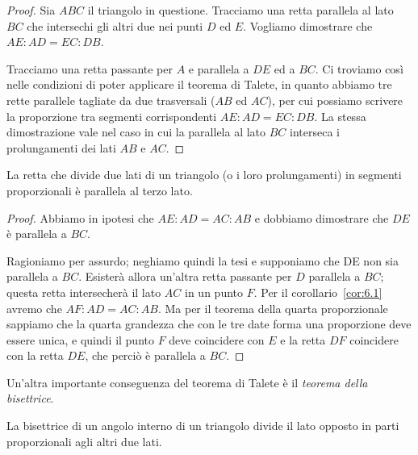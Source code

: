 \begin{figure}[!htb]
	\centering	
\end{figure}

\begin{proof}
Sia $ABC$ il triangolo in questione. Tracciamo una retta parallela al lato $BC$ che intersechi gli altri due nei punti $D$ ed $E$. Vogliamo dimostrare che $AE : AD = EC : DB$.

Tracciamo una retta passante per $A$ e parallela a $DE$ ed a $BC$. Ci troviamo così nelle condizioni di poter applicare il teorema di Talete, in quanto abbiamo tre rette parallele tagliate da due trasversali ($AB$ ed $AC$), per cui possiamo scrivere la proporzione tra segmenti corrispondenti $AE : AD = EC : DB$.
La stessa dimostrazione vale nel caso in cui la parallela al lato $BC$ interseca i prolungamenti dei lati $AB$ e $AC$.
\end{proof}

\begin{corollario}\label{cor:6.2}
La retta che divide due lati di un triangolo (o i loro prolungamenti) in segmenti proporzionali è parallela al terzo lato.
\end{corollario}

\begin{figure}[!htb]
	\centering	
\end{figure}

\begin{proof}
Abbiamo in ipotesi che $AE : AD = AC : AB$ e dobbiamo dimostrare che $DE$ è parallela a $BC$.

Ragioniamo per assurdo; neghiamo quindi la tesi e supponiamo che DE non sia parallela a $BC$. Esisterà allora un'altra retta passante per $D$ parallela a $BC$; questa retta intersecherà il lato $AC$ in un punto $F$. Per il corollario~\ref{cor:6.1} avremo che $AF : AD = AC : AB$.
Ma per il teorema della quarta proporzionale sappiamo che la quarta grandezza che con le tre date forma una proporzione deve essere unica, e quindi il punto $F$ deve coincidere con $E$ e la retta $DF$ coincidere con la retta $DE$, che perciò è parallela a $BC$.
\end{proof}

Un'altra importante conseguenza del teorema di Talete è il \emph{teorema della bisettrice}.
\begin{teorema}
La bisettrice di un angolo interno di un triangolo divide il lato opposto in parti proporzionali agli altri due lati.
\end{teorema}

